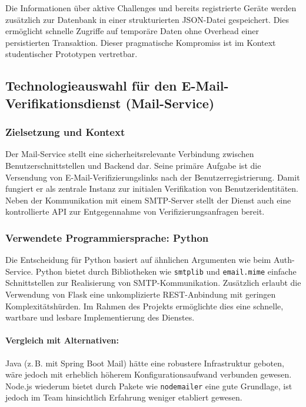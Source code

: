Die Informationen \"uber aktive Challenges und bereits registrierte Ger\"ate werden zus\"atzlich zur Datenbank in einer strukturierten JSON-Datei gespeichert. Dies erm\"oglicht schnelle Zugriffe auf tempor\"are Daten ohne Overhead einer persistierten Transaktion. Dieser pragmatische Kompromiss ist im Kontext studentischer Prototypen vertretbar.

\subsection{Technologieauswahl f\"ur den E-Mail-Verifikationsdienst (Mail-Service)}

\subsubsection*{Zielsetzung und Kontext}

Der Mail-Service stellt eine sicherheitsrelevante Verbindung zwischen Benutzerschnittstellen und Backend dar. Seine prim\"are Aufgabe ist die Versendung von E-Mail-Verifizierungslinks nach der Benutzerregistrierung. Damit fungiert er als zentrale Instanz zur initialen Verifikation von Benutzeridentit\"aten. Neben der Kommunikation mit einem SMTP-Server stellt der Dienst auch eine kontrollierte API zur Entgegennahme von Verifizierungsanfragen bereit.

\subsubsection*{Verwendete Programmiersprache: Python}

Die Entscheidung f\"ur Python basiert auf \"ahnlichen Argumenten wie beim Auth-Service. Python bietet durch Bibliotheken wie \texttt{smtplib} und \texttt{email.mime} einfache Schnittstellen zur Realisierung von SMTP-Kommunikation. Zus\"atzlich erlaubt die Verwendung von Flask eine unkomplizierte REST-Anbindung mit geringen Komplexit\"atsh\"urden. Im Rahmen des Projekts erm\"oglichte dies eine schnelle, wartbare und lesbare Implementierung des Dienstes.

\paragraph*{Vergleich mit Alternativen:}

Java (z.\,B. mit Spring Boot Mail) h\"atte eine robustere Infrastruktur geboten, w\"are jedoch mit erheblich h\"oherem Konfigurationsaufwand verbunden gewesen. Node.js wiederum bietet durch Pakete wie \texttt{nodemailer} eine gute Grundlage, ist jedoch im Team hinsichtlich Erfahrung weniger etabliert gewesen.

